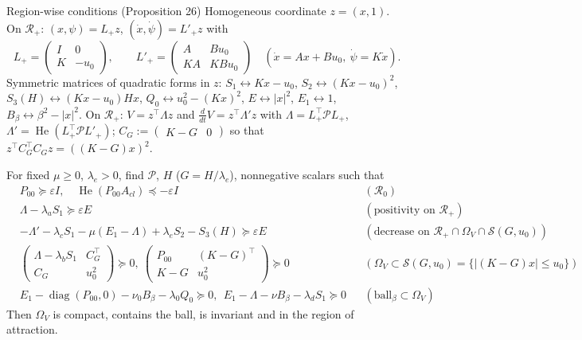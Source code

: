 \documentclass[10pt,aspectratio=169]{beamer}
\newcommand{\tr}{^{\top}}
\newcommand{\PP}{\mathcal{P}}
\DeclareMathOperator{\He}{He}
\DeclareMathOperator{\diag}{diag}
\begin{document}
\begin{frame}{Region-wise conditions (Proposition 26)}
\small Homogeneous coordinate $z=(x,1)$. On $\mathcal R_+$: $(x,\psi)=L_+z$, $(\dot x,\dot\psi)=L'_+z$ with
\[
L_+=\begin{pmatrix}I&0\\K&-u_0\end{pmatrix},\qquad L'_+=\begin{pmatrix}A&Bu_0\\KA&KBu_0\end{pmatrix}\quad(\dot x=Ax+Bu_0,\ \dot\psi=K\dot x).
\]
Symmetric matrices of quadratic forms in $z$: $S_1\leftrightarrow Kx-u_0$, $S_2\leftrightarrow(Kx-u_0)^2$, $S_3(H)\leftrightarrow(Kx-u_0)Hx$, $Q_0\leftrightarrow u_0^2-(Kx)^2$, $E\leftrightarrow|x|^2$, $E_1\leftrightarrow1$, $B_\beta\leftrightarrow\beta^2-|x|^2$. On $\mathcal R_+$: $V=z\tr\Lambda z$ and $\frac{d}{dt}V=z\tr\Lambda'z$ with $\Lambda=L_+\tr\PP L_+$, $\Lambda'=\He(L_+\tr\PP L'_+)$; $C_G:=\begin{pmatrix}K-G&0\end{pmatrix}$ so that $z\tr C_G\tr C_Gz=((K-G)x)^2$.
\medskip

For fixed $\mu\ge0$, $\lambda_e>0$, find $\PP$, $H$ ($G=H/\lambda_e$), nonnegative scalars such that
\begin{align*}
&P_{00}\succeq\varepsilon I,\quad \He(P_{00}A_{cl})\preceq-\varepsilon I &&(\mathcal R_0)\\
&\Lambda-\lambda_aS_1\succeq\varepsilon E &&(\text{positivity on }\mathcal R_+)\\
&-\Lambda'-\lambda_cS_1-\mu(E_1-\Lambda)+\lambda_eS_2-S_3(H)\succeq\varepsilon E &&(\text{decrease on }\mathcal R_+\cap\Omega_V\cap\mathcal S(G,u_0))\\
&\begin{pmatrix}\Lambda-\lambda_bS_1&C_G\tr\\C_G&u_0^2\end{pmatrix}\succeq0,\ \begin{pmatrix}P_{00}&(K-G)\tr\\K-G&u_0^2\end{pmatrix}\succeq0 &&(\Omega_V\subset\mathcal S(G,u_0)=\{|(K-G)x|\le u_0\})\\
&E_1-\diag(P_{00},0)-\nu_0B_\beta-\lambda_0Q_0\succeq0,\ \ E_1-\Lambda-\nu B_\beta-\lambda_dS_1\succeq0 &&(\text{ball}_\beta\subset\Omega_V)
\end{align*}
Then $\Omega_V$ is compact, contains the ball, is invariant and in the region of attraction.
\end{frame}
\end{document}
